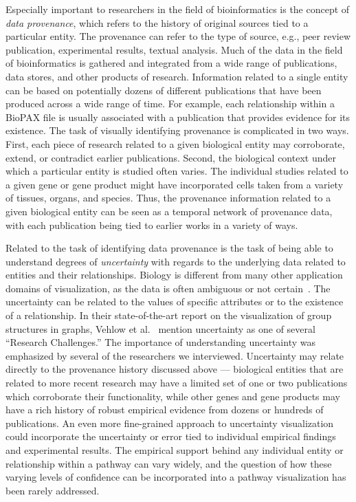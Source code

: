 \documentclass[twocolumn]{bmcart}%
\begin{document}
Especially important to researchers in the field of bioinformatics is the concept of \textit{data provenance}, which refers to the history of original sources tied to a particular entity.
The provenance can refer to the type of source, e.g., peer review publication, experimental results, textual analysis.
Much of the data in the field of bioinformatics is gathered and integrated from a wide range of publications, data stores, and other products of research.
Information related to a single entity can be based on potentially dozens of different publications that have been produced across a wide range of time.
For example, each relationship within a BioPAX file is usually associated with a publication that provides evidence for its existence.
The task of visually identifying provenance is complicated in two ways.
First, each piece of research related to a given biological entity may corroborate, extend, or contradict earlier publications.
Second, the biological context under which a particular entity is studied often varies.
The individual studies related to a given gene or gene product might have incorporated cells taken from a variety of tissues, organs, and species.
Thus, the provenance information related to a given biological entity can be seen as a temporal network of provenance data, with each publication being tied to earlier works in a variety of ways.

Related to the task of identifying data provenance is the task of being able to understand degrees of \textit{uncertainty} with regards to the underlying data related to entities and their relationships.
Biology is different from many other application domains of visualization, as the data is often ambiguous or not certain~\cite{kohlbacher2014multivariate}.
The uncertainty can be related to the values of specific attributes or to the existence of a relationship.
In their state-of-the-art report on the visualization of group structures in graphs, Vehlow et al.~\cite{vehlow2015state} mention uncertainty as one of several ``Research Challenges.''
The importance of understanding uncertainty was emphasized by several of the researchers we interviewed.
Uncertainty may relate directly to the provenance history discussed above --- biological entities that are related to more recent research may have a limited set of one or two publications which corroborate their functionality, while other genes and gene products may have a rich history of robust empirical evidence from dozens or hundreds of publications.
An even more fine-grained approach to uncertainty visualization could incorporate the uncertainty or error tied to individual empirical findings and experimental results.
The empirical support behind any individual entity or relationship within a pathway can vary widely, and the question of how these varying levels of confidence can be incorporated into a pathway visualization has been rarely addressed.
\end{document}
